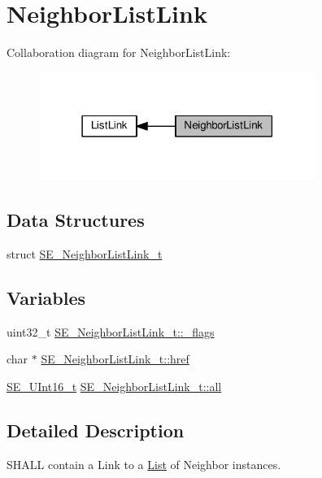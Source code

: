 \hypertarget{group__NeighborListLink}{}\section{Neighbor\+List\+Link}
\label{group__NeighborListLink}
Collaboration diagram for Neighbor\+List\+Link\+:\nopagebreak
\begin{figure}[H]
\begin{center}
\leavevmode
\includegraphics[width=255pt]{group__NeighborListLink}
\end{center}
\end{figure}
\subsection*{Data Structures}
\begin{DoxyCompactItemize}
\item 
struct \hyperlink{structSE__NeighborListLink__t}{S\+E\+\_\+\+Neighbor\+List\+Link\+\_\+t}
\end{DoxyCompactItemize}
\subsection*{Variables}
\begin{DoxyCompactItemize}
\item 
uint32\+\_\+t \hyperlink{group__NeighborListLink_gaba3f6f896c85e0c25653154019dd1471}{S\+E\+\_\+\+Neighbor\+List\+Link\+\_\+t\+::\+\_\+flags}
\item 
char $\ast$ \hyperlink{group__NeighborListLink_ga5486b4efff053b4817879fd020db5f42}{S\+E\+\_\+\+Neighbor\+List\+Link\+\_\+t\+::href}
\item 
\hyperlink{group__UInt16_gac68d541f189538bfd30cfaa712d20d29}{S\+E\+\_\+\+U\+Int16\+\_\+t} \hyperlink{group__NeighborListLink_gabbd6ebe746c9d4582fc7f972ac1be6c5}{S\+E\+\_\+\+Neighbor\+List\+Link\+\_\+t\+::all}
\end{DoxyCompactItemize}


\subsection{Detailed Description}
S\+H\+A\+LL contain a Link to a \hyperlink{structList}{List} of Neighbor instances. 

